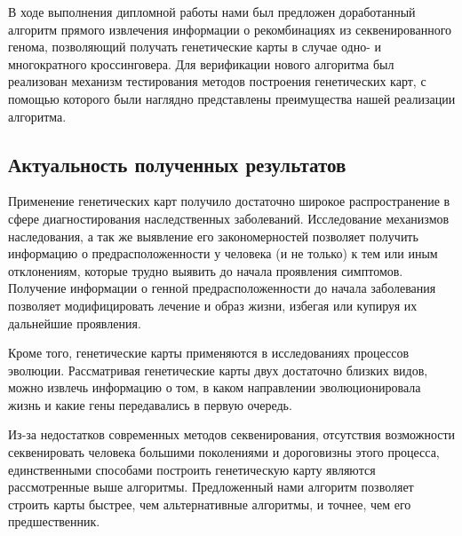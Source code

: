 \documentclass{matmex-diploma-custom}
\begin{document}
В ходе выполнения дипломной работы нами был предложен доработанный
алгоритм прямого извлечения информации о рекомбинациях из
секвенированного генома, позволяющий получать генетические карты в
случае одно- и многократного кроссинговера.  Для верификации нового
алгоритма был реализован механизм тестирования методов построения
генетических карт, с помощью которого были наглядно представлены
преимущества нашей реализации алгоритма.

\subsection*{Актуальность полученных результатов}

Применение генетических карт получило достаточно широкое
распространение в сфере диагностирования наследственных
заболеваний. Исследование механизмов наследования, а так же выявление
его закономерностей позволяет получить информацию о
предрасположенности у человека (и не только) к тем или иным
отклонениям, которые трудно выявить до начала проявления
симптомов. Получение информации о генной предрасположенности до начала
заболевания позволяет модифицировать лечение и образ жизни, избегая
или купируя их дальнейшие проявления.

Кроме того, генетические карты применяются в исследованиях процессов
эволюции. Рассматривая генетические карты двух достаточно близких
видов, можно извлечь информацию о том, в каком направлении
эволюционировала жизнь и какие гены передавались в первую очередь.

Из-за недостатков современных методов секвенирования, отсутствия
возможности секвенировать человека большими поколениями и дороговизны
этого процесса, единственными способами построить генетическую карту
являются рассмотренные выше алгоритмы. Предложенный нами алгоритм
позволяет строить карты быстрее, чем альтернативные алгоритмы, и
точнее, чем его предшественник.

\clearpage
{}


\end{document}
